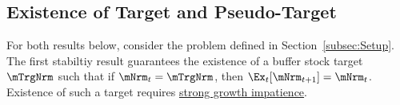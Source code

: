 \documentclass[\econtexRoot/BufferStockTheory]{subfiles}
\begin{document}


\hypertarget{onetarget}{}
\hypertarget{Unique-Stable-Points}{}


\subsection{Existence of Target and Pseudo-Target}\label{subsec:onetarget}\hypertarget{TheoremTarget}{}

For both results below, consider the problem defined in Section~\ref{subsec:Setup}.
The first stabiltiy result guarantees the existence of a buffer stock target $\mTrgNrm$ such that if $\mNrm_{t}=\mTrgNrm$, then $\Ex_{t}[\mNrm_{t+1}]=\mNrm_{t}$.
Existence of such a target requires \hyperlink{GICMod}{strong growth impatience}.
\end{document}
